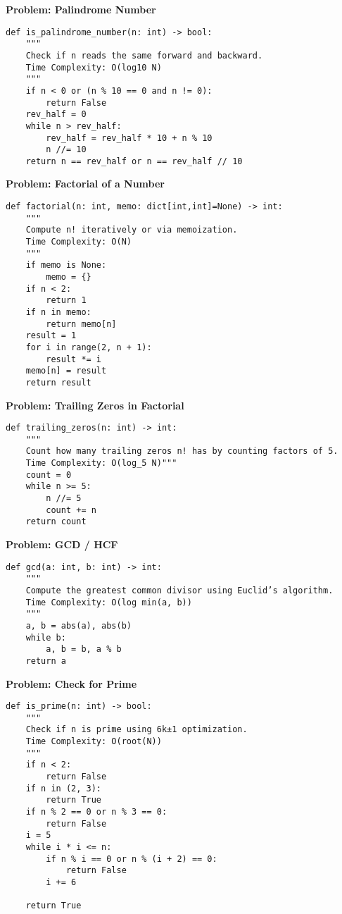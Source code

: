 \noindent\textbf{Problem: Palindrome Number}
\begin{verbatim}
def is_palindrome_number(n: int) -> bool:
    """
    Check if n reads the same forward and backward.
    Time Complexity: O(log10 N)
    """
    if n < 0 or (n % 10 == 0 and n != 0):
        return False
    rev_half = 0
    while n > rev_half:
        rev_half = rev_half * 10 + n % 10
        n //= 10
    return n == rev_half or n == rev_half // 10
\end{verbatim}
\noindent\textbf{Problem: Factorial of a Number}
\begin{verbatim}
def factorial(n: int, memo: dict[int,int]=None) -> int:
    """
    Compute n! iteratively or via memoization.
    Time Complexity: O(N)
    """
    if memo is None:
        memo = {}
    if n < 2:
        return 1
    if n in memo:
        return memo[n]
    result = 1
    for i in range(2, n + 1):
        result *= i
    memo[n] = result
    return result
\end{verbatim}
\noindent\textbf{Problem: Trailing Zeros in Factorial}
\begin{verbatim}
def trailing_zeros(n: int) -> int:
    """
    Count how many trailing zeros n! has by counting factors of 5.
    Time Complexity: O(log_5 N)"""
    count = 0
    while n >= 5:
        n //= 5
        count += n
    return count
\end{verbatim}
\noindent\textbf{Problem: GCD / HCF}
\begin{verbatim}
def gcd(a: int, b: int) -> int:
    """
    Compute the greatest common divisor using Euclid’s algorithm.
    Time Complexity: O(log min(a, b))
    """
    a, b = abs(a), abs(b)
    while b:
        a, b = b, a % b
    return a
\end{verbatim}
\noindent\textbf{Problem: Check for Prime}
\begin{verbatim}
def is_prime(n: int) -> bool:
    """
    Check if n is prime using 6k±1 optimization.
    Time Complexity: O(root(N)) 
    """
    if n < 2:
        return False
    if n in (2, 3):
        return True
    if n % 2 == 0 or n % 3 == 0:
        return False
    i = 5
    while i * i <= n:
        if n % i == 0 or n % (i + 2) == 0:
            return False
        i += 6

    return True
\end{verbatim}

